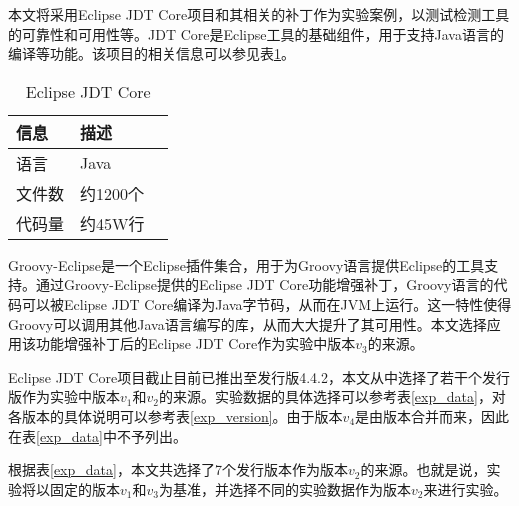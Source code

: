 本文将采用Eclipse JDT Core项目和其相关的补丁作为实验案例，以测试检测工具的可靠性和可用性等。JDT Core是Eclipse工具的基础组件，用于支持Java语言的编译等功能。该项目的相关信息可以参见表\ref {jdt_core}。

\begin{table}[H]
	\caption{Eclipse JDT Core}
	\label{jdt_core}
	\centering
	\begin{tabular}{llc}
		\toprule[1.5pt]
		{\heiti 信息} & {\heiti 描述} \\\midrule[1pt]
		语言 & Java \\
		文件数 & 约1200个\\
		代码量 & 约45W行\\
		\bottomrule[1.5pt]
	\end{tabular}
\end{table}

Groovy-Eclipse是一个Eclipse插件集合，用于为Groovy语言提供Eclipse的工具支持。通过Groovy-Eclipse提供的Eclipse JDT Core功能增强补丁，Groovy语言的代码可以被Eclipse JDT Core编译为Java字节码，从而在JVM上运行。这一特性使得Groovy可以调用其他Java语言编写的库，从而大大提升了其可用性。本文选择应用该功能增强补丁后的Eclipse JDT Core作为实验中版本$v_3$的来源。

Eclipse JDT Core项目截止目前已推出至发行版4.4.2，本文从中选择了若干个发行版作为实验中版本$v_1$和$v_2$的来源。实验数据的具体选择可以参考表\ref {exp_data}，对各版本的具体说明可以参考表\ref {exp_version}。由于版本$v_4$是由版本合并而来，因此在表\ref {exp_data}中不予列出。

根据表\ref {exp_data}，本文共选择了7个发行版本作为版本$v_2$的来源。也就是说，实验将以固定的版本$v_1$和$v_3$为基准，并选择不同的实验数据作为版本$v_2$来进行实验。


